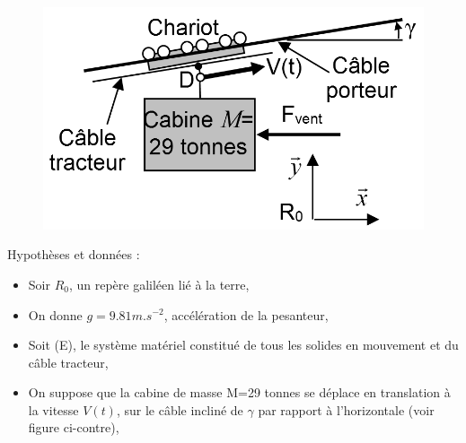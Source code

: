 \begin{figure}
	\vspace{-10pt}
	\centering \includegraphics[width=0.8\linewidth]{img/fig24}
	\label{fig24}
\end{figure}

Hypothèses et données :
\begin{itemize}
 \item Soir $R_0$, un repère galiléen lié à la terre,
 \item On donne $g=9.81 m.s^{-2}$, accélération de la pesanteur,
 \item Soit (E), le système matériel constitué de tous les solides en mouvement et du câble tracteur,
 \item On suppose que la cabine de masse M=29 tonnes se déplace en translation à la vitesse $V(t)$, sur le câble incliné de $\gamma$ par rapport à l'horizontale (voir figure ci-contre),
\end{itemize}

